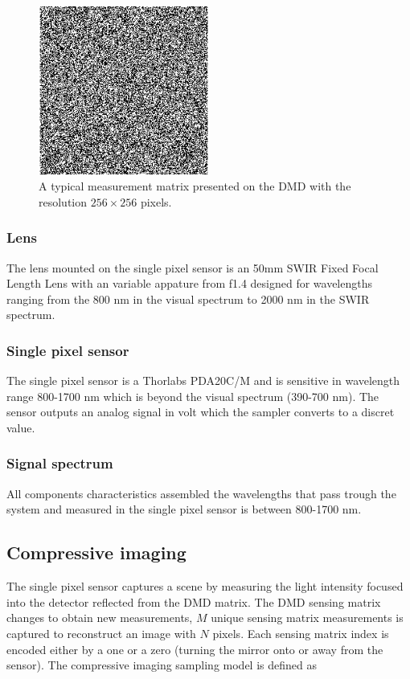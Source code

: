 \begin{figure}[H]
    \centering
    \includegraphics[width = 0.5\textwidth]{gfx/DMD_pattern.png}
    \caption{A typical measurement matrix presented on the DMD with the resolution $256 \times 256$ pixels.}
    \label{fig:dmd_pattern}
\end{figure}



\subsubsection{Lens}
The lens mounted on the single pixel sensor is an 50mm SWIR Fixed Focal Length Lens with an variable appature from f1.4 designed for wavelengths ranging from the 800 nm in the visual spectrum to 2000 nm in the SWIR spectrum. \cite{website:SWIR_objective}

\subsubsection{Single pixel sensor}
The single pixel sensor is a Thorlabs PDA20C/M and is sensitive in wavelength range 800-1700 nm which is beyond the visual spectrum (390-700 nm). The sensor outputs an analog signal in volt which the sampler converts to a discret value. \cite{manual:PDA}

\subsubsection{Signal spectrum}
All components characteristics assembled the wavelengths that pass trough the system and measured in the single pixel sensor is between 800-1700 nm.



\subsection{Compressive imaging}
The single pixel sensor captures a scene by measuring the light intensity focused into the detector reflected from the DMD matrix. The DMD sensing matrix changes to obtain new measurements, $M$ unique sensing matrix measurements is captured to reconstruct an image with $N$ pixels. Each sensing matrix index is encoded either  by a one or a zero (turning the mirror onto or away from the sensor). The compressive imaging sampling model is defined as

